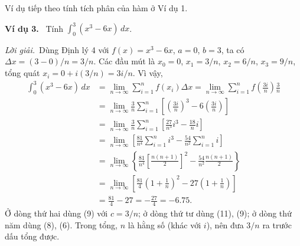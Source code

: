 \documentclass[12pt,a4paper]{article}
\newcommand{\ex}[1]{\par\medskip\noindent\textbf{Ví dụ #1.}\ }
\newcommand{\sol}{\par\nopagebreak[4]\noindent\textit{Lời giải.}\ }
\begin{document}
Ví dụ tiếp theo tính tích phân của hàm ở Ví dụ 1.
\ex{3} Tính $\displaystyle\int_0^3(x^3-6x)\,dx$.
\sol Dùng Định lý 4 với $f(x)=x^3-6x$, $a=0$, $b=3$, ta có $\Delta x=(3-0)/n=3/n$. Các đầu mút là $x_0=0$, $x_1=3/n$, $x_2=6/n$, $x_3=9/n$, tổng quát $x_i=0+i(3/n)=3i/n$. Vì vậy,
\begin{align*}
\int_0^3(x^3-6x)\,dx&=\lim_{n\to\infty}\sum_{i=1}^n f(x_i)\Delta x=\lim_{n\to\infty}\sum_{i=1}^n f\left(\frac{3i}n\right)\frac3n\\
&=\lim_{n\to\infty}\frac3n\sum_{i=1}^n\left[\left(\frac{3i}n\right)^3-6\left(\frac{3i}n\right)\right]\\
&=\lim_{n\to\infty}\frac3n\sum_{i=1}^n\left[\frac{27}{n^3}i^3-\frac{18}n i\right]\\
&=\lim_{n\to\infty}\left[\frac{81}{n^4}\sum_{i=1}^n i^3-\frac{54}{n^2}\sum_{i=1}^n i\right]\\
&=\lim_{n\to\infty}\left\{\frac{81}{n^4}\left[\frac{n(n+1)}2\right]^2-\frac{54}{n^2}\frac{n(n+1)}2\right\}\\
&=\lim_{n\to\infty}\left[\frac{81}4\left(1+\frac1n\right)^2-27\left(1+\frac1n\right)\right]\\
&=\frac{81}4-27=-\frac{27}4=-6.75.
\end{align*}
Ở dòng thứ hai dùng (9) với $c=3/n$; ở dòng thứ tư dùng (11), (9); ở dòng thứ năm dùng (8), (6). Trong tổng, $n$ là hằng số (khác với $i$), nên đưa $3/n$ ra trước dấu tổng được.
\end{document}
